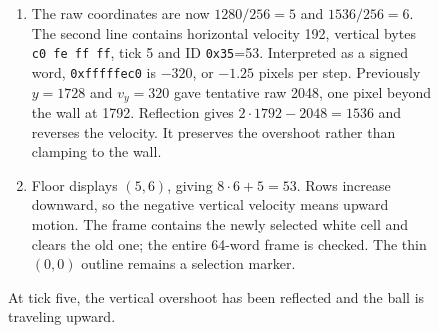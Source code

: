 \begin{figure}[htbp]
\begin{minipage}{\linewidth}
\begin{enumerate}
      \item The raw coordinates are now $1280/256=5$ and $1536/256=6$. The second line contains horizontal velocity 192, vertical bytes \texttt{c0 fe ff ff}, tick 5 and ID \texttt{0x35}=53. Interpreted as a signed word, \texttt{0xfffffec0} is $-320$, or $-1.25$ pixels per step. Previously $y=1728$ and $v_y=320$ gave tentative raw 2048, one pixel beyond the wall at 1792. Reflection gives $2\cdot1792-2048=1536$ and reverses the velocity. It preserves the overshoot rather than clamping to the wall.
      \item Floor displays $(5,6)$, giving $8\cdot6+5=53$. Rows increase downward, so the negative vertical velocity means upward motion. The frame contains the newly selected white cell and clears the old one; the entire 64-word frame is checked. The thin $(0,0)$ outline remains a selection marker.
    \end{enumerate}
  \end{minipage}
  \caption{At tick five, the vertical overshoot has been reflected and the ball is traveling upward.}
  \label{capture:012-fixed-point-ball-f03-reflection}
  \label{ball-f03-reflection}
\end{figure}
\par
